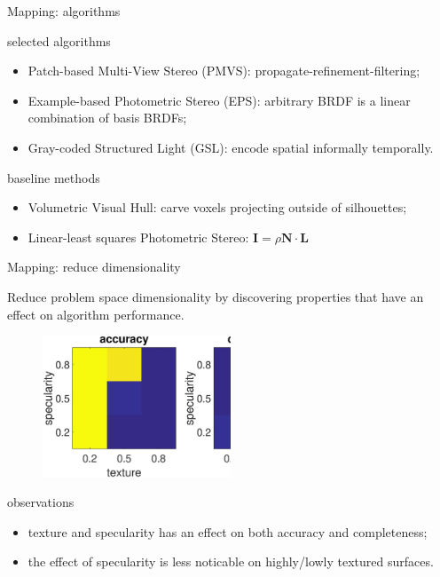 \documentclass[10pt]{beamer}
\begin{document}
\begin{frame}{Mapping: algorithms}

\begin{exampleblock}{selected algorithms}
\begin{itemize}
\item Patch-based Multi-View Stereo (PMVS): propagate-refinement-filtering;
\item Example-based Photometric Stereo (EPS): arbitrary BRDF is a linear combination of basis BRDFs;
\item Gray-coded Structured Light (GSL): encode spatial informally temporally.
\end{itemize}
\end{exampleblock}

\begin{exampleblock}{baseline methods}
\begin{itemize}
\item Volumetric Visual Hull: carve voxels projecting outside of silhouettes;
\item Linear-least squares Photometric Stereo: $\mathbf{I}=\rho\mathbf{N}\cdot\mathbf{L}$
\end{itemize}
\end{exampleblock}

\end{frame}

\begin{frame}{Mapping: reduce dimensionality}

Reduce problem space dimensionality by discovering properties that have an effect on algorithm performance.
\begin{figure}
\centering
\includegraphics[width=0.5\textwidth]{mapping/eval_prop/mvs_tex_spec}
\end{figure}

\begin{exampleblock}{observations}
\begin{itemize}
\item texture and specularity has an effect on both accuracy and completeness;
\item the effect of specularity is less noticable on highly/lowly textured surfaces.
\end{itemize}
\end{exampleblock}

\end{frame}
\end{document}
